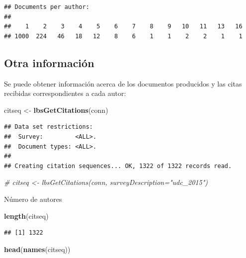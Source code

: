 \documentclass[
]{book}
\newenvironment{Shaded}{\begin{snugshade}}{\end{snugshade}}
\newcommand{\CommentTok}[1]{\textcolor[rgb]{0.56,0.35,0.01}{\textit{#1}}}
\newcommand{\FunctionTok}[1]{\textcolor[rgb]{0.13,0.29,0.53}{\textbf{#1}}}
\newcommand{\NormalTok}[1]{#1}
\newcommand{\OtherTok}[1]{\textcolor[rgb]{0.56,0.35,0.01}{#1}}
\begin{document}
\begin{verbatim}
## Documents per author:
## 
##    1    2    3    4    5    6    7    8    9   10   11   13   16 
## 1000  224   46   18   12    8    6    1    1    2    2    1    1
\end{verbatim}

\hypertarget{otra-informaciuxf3n}{%
\subsection{Otra información}\label{otra-informaciuxf3n}}

Se puede obtener información acerca de los documentos producidos y las citas
recibidas correspondientes a cada autor:

\begin{Shaded}
\begin{Highlighting}[]
\NormalTok{citseq }\OtherTok{\textless{}{-}} \FunctionTok{lbsGetCitations}\NormalTok{(conn)}
\end{Highlighting}
\end{Shaded}

\begin{verbatim}
## Data set restrictions:
##  Survey:         <ALL>.
##  Document types: <ALL>.
## 
## Creating citation sequences... OK, 1322 of 1322 records read.
\end{verbatim}

\begin{Shaded}
\begin{Highlighting}[]
\CommentTok{\# citseq \textless{}{-} lbsGetCitations(conn, surveyDescription="udc\_2015")}
\end{Highlighting}
\end{Shaded}

Número de autores

\begin{Shaded}
\begin{Highlighting}[]
\FunctionTok{length}\NormalTok{(citseq) }
\end{Highlighting}
\end{Shaded}

\begin{verbatim}
## [1] 1322
\end{verbatim}

\begin{Shaded}
\begin{Highlighting}[]
\FunctionTok{head}\NormalTok{(}\FunctionTok{names}\NormalTok{(citseq))}
\end{Highlighting}
\end{Shaded}
\end{document}
